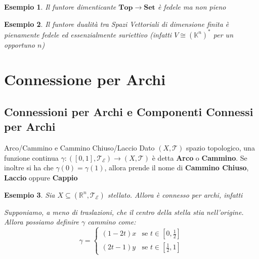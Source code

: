 \documentclass[11pt,a4paper,twoside]{article}
\newtheorem{es}{Esempio}
\theoremstyle{definition}
\begin{document}
\begin{es}
	Il funtore dimenticante $\bm{Top} \to \bm{Set}$ è fedele ma non pieno
\end{es}

\begin{es}
	Il funtore dualità tra Spazi Vettoriali di dimensione finita è pienamente fedele ed essenzialmente suriettivo (infatti $V \cong (\mathbb K^n)^*$ per un opportuno $n$)
\end{es}

\newpage

\section{Connessione per Archi}

\subsection{Connessioni per Archi e Componenti Connessi per Archi}

\begin{defn}{Arco/Cammino e Cammino Chiuso/Laccio}{}
	Dato $(X, \mathcal T)$ spazio topologico, una funzione continua $\gamma:([0,1], \mathcal T_\mathcal E) \to (X, \mathcal T)$ è detta \textbf{Arco} o \textbf{Cammino}. Se inoltre si ha che $\gamma(0) = \gamma(1)$, allora prende il nome di \textbf{Cammino Chiuso}, \textbf{Laccio} oppure \textbf{Cappio}
\end{defn}

\begin{es}
	Sia $X \subseteq (\mathbb R^n, \mathcal T_\mathcal E)$ stellato. Allora è connesso per archi, infatti
	\begin{center}
	\end{center}
	Supponiamo, a meno di traslazioni, che il centro della stella stia nell'origine. Allora possiamo definire $\gamma$ cammino come:
	\[ \gamma = \begin{cases} (1-2t)x & \text{se } t \in [0,\frac 12]\\ (2t-1)y& \text{se }t \in [\frac 12,1] \end{cases}\]
\end{es}
\end{document}
